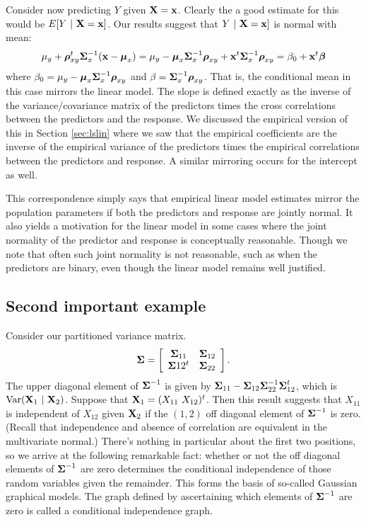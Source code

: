 Consider now predicting $Y$ given $\mathbf{X} = \mathbf{x}$. Clearly the a good estimate
for this would be $E[Y ~|~ \mathbf{X} = \mathbf{x}]$. Our results
suggest that $Y ~|~ \mathbf{X} = \mathbf{x}]$ is normal with mean:
$$
\mu_y + \boldsymbol{\rho}_{xy}^t\boldsymbol{\Sigma}_x^{-1} (\mathbf{x} - \boldsymbol{\mu}_x)
= \mu_y - \boldsymbol{\mu}_x \boldsymbol{\Sigma}_x^{-1}\boldsymbol{\rho}_{xy} + \mathbf{x}^t \boldsymbol{\Sigma}_x^{-1} \boldsymbol{\rho}_{xy}
= \beta_0 + \mathbf{x}^t \boldsymbol{\beta}
$$
where $\beta_0 = \mu_y - \boldsymbol{\mu}_x \boldsymbol{\Sigma}_x^{-1}\boldsymbol{\rho}_{xy}$ and $\beta = \boldsymbol{\Sigma}_x^{-1} \boldsymbol{\rho}_{xy}$. That is, the conditional mean in this case mirrors the
linear model. The slope is defined exactly as the inverse of the variance/covariance matrix
of the predictors times the cross correlations between the predictors and the response.
We discussed the empirical version of this in Section \ref{sec:lslin} where we
saw that the empirical coefficients are the inverse of the empirical variance of 
the predictors times the empirical correlations between the predictors and response. 
A similar mirroring occurs for the intercept as well. 

This correspondence simply says that empirical linear model estimates mirror the population parameters if both the predictors and response are jointly normal. It also yields
a motivation for the linear model in some cases where the joint normality of the
predictor and response is conceptually reasonable. Though we note that often such
joint normality is not reasonable, such as when the predictors are binary, even
though the linear model remains well justified. 

\subsection{Second important example}
Consider our partitioned variance matrix. 
$$
\boldsymbol{\Sigma} = \left[
\begin{array}{cc}
\boldsymbol{\Sigma}_{11} & \boldsymbol{\Sigma}_{12} \\
\boldsymbol{\Sigma}{12}^t & \boldsymbol{\Sigma}_{22}
\end{array}
\right].
$$
The upper diagonal element of $\boldsymbol{\Sigma}^{-1}$ is given by  $\boldsymbol{\Sigma}_{11} - \boldsymbol{\Sigma}_{12} \boldsymbol{\Sigma}_{22}^{-1} \boldsymbol{\Sigma}_{12}^t$, which is $\mbox{Var}(\mathbf{X}_1 ~|~ \mathbf{X}_2)$. Suppose that
$\mathbf{X}_1 = (X_{11} ~ X_{12})^t$. Then this result suggests that
$X_{11}$ is independent of $X_{12}$ given $\mathbf{X}_2$ if the $(1,2)$ off diagonal element
of $\boldsymbol{\Sigma}^{-1}$ is zero. (Recall that independence and absence of correlation are
equivalent in the multivariate normal.) There's nothing in particular about the
first two positions, so we arrive at the following remarkable fact: whether or not
the off diagonal elements of $\boldsymbol{\Sigma}^{-1}$ are zero determines the conditional
independence of those random variables given the remainder. This forms the
basis of so-called Gaussian graphical models. The graph defined by ascertaining
which elements of $\boldsymbol{\Sigma}^{-1}$ are zero is called a conditional independence graph.







